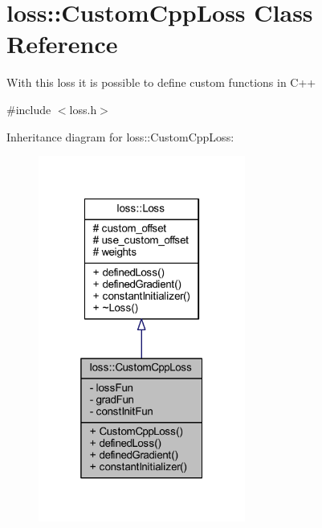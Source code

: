 \hypertarget{classloss_1_1_custom_cpp_loss}{}\section{loss\+:\+:Custom\+Cpp\+Loss Class Reference}
\label{classloss_1_1_custom_cpp_loss}


With this loss it is possible to define custom functions in {\ttfamily C++}  




{\ttfamily \#include $<$loss.\+h$>$}



Inheritance diagram for loss\+:\+:Custom\+Cpp\+Loss\+:
\nopagebreak
\begin{figure}[H]
\begin{center}
\leavevmode
\includegraphics[width=193pt]{classloss_1_1_custom_cpp_loss__inherit__graph}
\end{center}
\end{figure}


